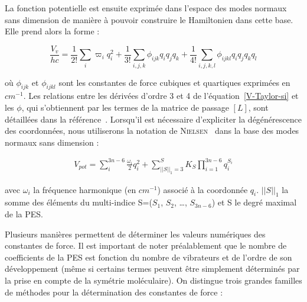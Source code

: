 La fonction potentielle est ensuite exprimée dans l'espace des modes normaux sans dimension de manière à pouvoir construire le Hamiltonien dans cette base. Elle prend alors la forme :

\begin{equation}
	\frac{V_v}{hc} = \frac{1}{2!} \sum_i \varpi_i q^2_i + \frac{1}{3!} \sum_{i,j,k} \phi_{ijk}q_i q_j q_k + \frac{1}{4!} \sum_{i,j,k,l} \phi_{ijkl}q_i q_j q_k q_l
\end{equation}

\noindent où $\phi_{ijk}$ et $\phi_{ijkl}$ sont les constantes de force cubiques et quartiques exprimées en $cm^{-1}$. Les relations entre les dérivées d'ordre 3 et 4 de l'équation~\ref{V-Taylor-si} et les $\phi$, qui s'obtiennent par les termes de la matrice de passage $[L]$, sont détaillées dans la référence~\cite{II-8}.
Lorsqu'il est nécessaire d'expliciter la dégénérescence des coordonnées, nous utiliserons la notation de \textsc{Nielsen}~\cite{II-16} dans la base des modes normaux sans dimension :

\begin{align} \label{V-Nielsen}
V_{pot} = \sum_i^{3n-6} \frac{\omega_i}{2} q_i^2 + \sum_{{\vert \vert S \vert \vert}_1 = 3}^{S} K_S \prod_{i=1}^{3n-6} q_i^{S_i}
\end{align}

avec $\omega_i$ la fréquence harmonique (en $cm^{-1}$) associé à la coordonnée $q_i$. ${\vert \vert S \vert \vert}_1$ la somme des éléments du multi-indice S=($S_1$, $S_2$, …, $S_{3n-6}$) et S le degré maximal de la PES. 

Plusieurs manières permettent de déterminer les valeurs numériques des constantes de force. Il est important de noter préalablement que le nombre de coefficients de la PES est fonction du nombre de vibrateurs et de l’ordre de son développement (même si certains termes peuvent être simplement déterminés par la prise en compte de la symétrie moléculaire). On distingue trois grandes familles de méthodes pour la détermination des constantes de force : 

